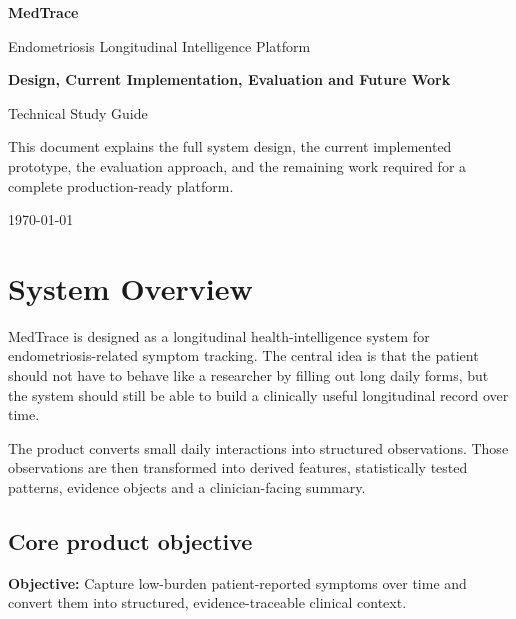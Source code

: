 \documentclass[11pt,a4paper]{article}
\begin{document}
\begin{titlepage}
  \centering
  \vspace*{2cm}
  {\Huge\bfseries\color{Blue} MedTrace\par}
  \vspace{0.4cm}
  {\Large Endometriosis Longitudinal Intelligence Platform\par}
  \vspace{1.2cm}
  {\Large\bfseries Design, Current Implementation, Evaluation and Future Work\par}
  \vspace{0.5cm}
  {\large Technical Study Guide\par}
  \vfill
  \begin{designbox}
    \centering
    This document explains the full system design, the current implemented prototype, the evaluation approach, and the remaining work required for a complete production-ready platform.
  \end{designbox}
  \vfill
  {\large \today\par}
\end{titlepage}

\tableofcontents
\newpage

\section{System Overview}

MedTrace is designed as a longitudinal health-intelligence system for endometriosis-related symptom tracking. The central idea is that the patient should not have to behave like a researcher by filling out long daily forms, but the system should still be able to build a clinically useful longitudinal record over time.

The product converts small daily interactions into structured observations. Those observations are then transformed into derived features, statistically tested patterns, evidence objects and a clinician-facing summary.

\subsection{Core product objective}

\begin{designbox}
\textbf{Objective:} Capture low-burden patient-reported symptoms over time and convert them into structured, evidence-traceable clinical context.
\end{designbox}
\end{document}
